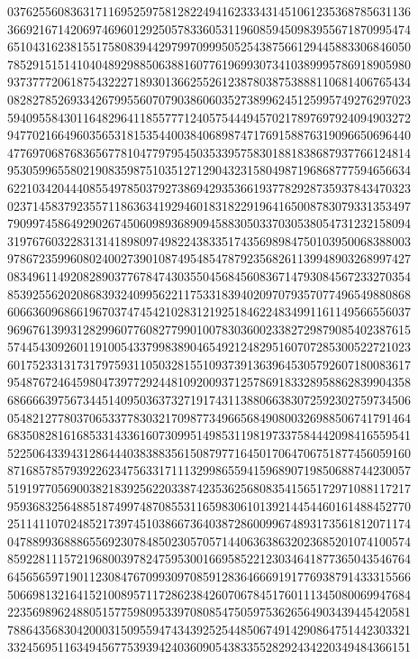 {{    0376255608363171169525975812822494162333431451061235368785631136 ~
    3669216714206974696012925057833605311960859450983955671870995474 ~
    6510431623815517580839442979970999505254387566129445883306846050 ~
    7852915151410404892988506388160776196993073410389995786918905980 ~
    9373777206187543222718930136625526123878038753888110681406765434 ~
    0828278526933426799556070790386060352738996245125995749276297023 ~
    5940955843011648296411855777124057544494570217897697924094903272 ~
    9477021664960356531815354400384068987471769158876319096650696440 ~
    4776970687683656778104779795450353395758301881838687937766124814 ~
    9530599655802190835987510351271290432315804987196868777594656634 ~
    6221034204440855497850379273869429353661937782928735937843470323 ~
    0237145837923557118636341929460183182291964165008783079331353497 ~
    7909974586492902674506098936890945883050337030538054731232158094 ~
    3197676032283131418980974982243833517435698984750103950068388003 ~
    9786723599608024002739010874954854787923568261139948903268997427 ~
    0834961149208289037767847430355045684560836714793084567233270354 ~
    8539255620208683932409956221175331839402097079357077496549880868 ~
    6066360968661967037474542102831219251846224834991161149566556037 ~
    9696761399312829960776082779901007830360023382729879085402387615 ~
    5744543092601191005433799838904654921248295160707285300522721023 ~
    6017523313173179759311050328155109373913639645305792607180083617 ~
    9548767246459804739772924481092009371257869183328958862839904358 ~
    6866663975673445140950363732719174311388066383072592302759734506 ~
    0548212778037065337783032170987734966568490800326988506741791464 ~
    6835082816168533143361607309951498531198197337584442098416559541 ~
    5225064339431286444038388356150879771645017064706751877456059160 ~
    8716857857939226234756331711132998655941596890719850688744230057 ~
    5191977056900382183925622033874235362568083541565172971088117217 ~
    9593683256488518749974870855311659830610139214454460161488452770 ~
    2511411070248521739745103866736403872860099674893173561812071174 ~
    0478899368886556923078485023057057144063638632023685201074100574 ~
    8592281115721968003978247595300166958522123034641877365043546764 ~
    6456565971901123084767099309708591283646669191776938791433315566 ~
    5066981321641521008957117286238426070678451760111345080069947684 ~
    2235698962488051577598095339708085475059753626564903439445420581 ~
    7886435683042000315095594743439252544850674914290864751442303321 ~
    3324569511634945677539394240360905438335528292434220349484366151 ~
}}
